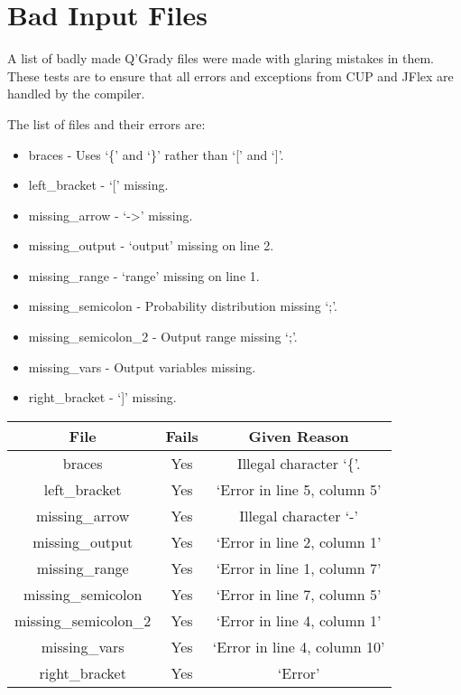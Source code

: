 \documentclass[report.tex]{subfiles}
\begin{document}

\section{Bad Input Files} %
\label{sec:bad_input_files}
A list of badly made Q'Grady files were made with glaring mistakes in them.
These tests are to ensure that all errors and exceptions from CUP and JFlex are
handled by the compiler.

The list of files and their errors are:
\begin{itemize}
    \item braces - Uses `\{' and `\}' rather than `[' and `]'.
    \item left\_bracket - `[' missing.
    \item missing\_arrow - `->' missing.
    \item missing\_output - `output' missing on line 2.
    \item missing\_range - `range' missing on line 1.
    \item missing\_semicolon - Probability distribution missing `;'.
    \item missing\_semicolon\_2 - Output range missing `;'.
    \item missing\_vars - Output variables missing.
    \item right\_bracket - `]' missing.
\end{itemize}

\begin{table}[H]
    \centering
    \begin{tabular}{c | c | c}
    File & Fails & Given Reason \\
    \hline
    braces & Yes & Illegal character `\{'. \\
    left\_bracket & Yes & `Error in line 5, column 5' \\
    missing\_arrow & Yes & Illegal character `-' \\
    missing\_output & Yes & `Error in line 2, column 1' \\
    missing\_range & Yes & `Error in line 1, column 7' \\
    missing\_semicolon & Yes & `Error in line 7, column 5' \\
    missing\_semicolon\_2 & Yes & `Error in line 4, column 1' \\
    missing\_vars & Yes & `Error in line 4, column 10' \\
    right\_bracket & Yes & `Error' \\
    \hline
    \end{tabular}
\end{table}
\end{document}
